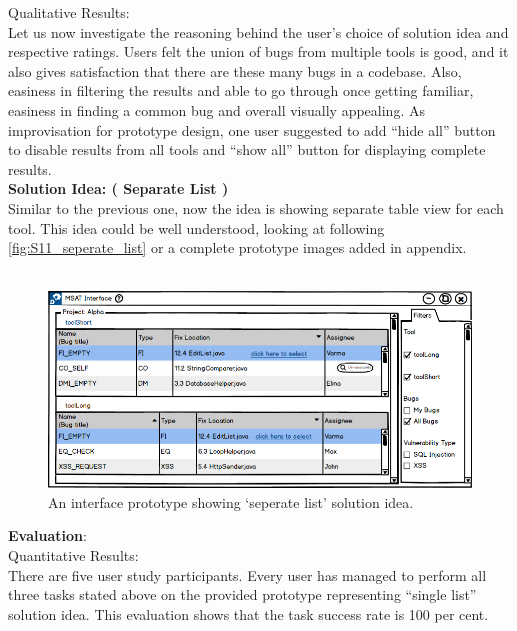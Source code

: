 Qualitative Results: \\

Let us now investigate the reasoning behind the user’s choice of solution idea and respective ratings. Users felt the union of bugs from multiple tools is good, and it also gives satisfaction that there are these many bugs in a codebase. Also, easiness in filtering the results and able to go through once getting familiar, easiness in finding a common bug and overall visually appealing. As improvisation for prototype design, one user suggested to add “hide all” button to disable results from all tools and “show all” button for displaying complete results. \\


\textbf{Solution Idea: ( Separate List )} \\

Similar to the previous one, now the idea is showing separate table view for each tool. This idea could be well understood, looking at following \autoref{fig:S11_seperate_list} or a complete prototype images added in appendix. \\ \\


\begin{figure}[hbt!]
	\centering
	\includegraphics[width=\linewidth]{figures/solution_ideas_snaps/S11_seperate_list}
	\caption{An interface prototype showing ‘seperate list’ solution idea.}
	\label{fig:S11_seperate_list}
\end{figure}


\textbf{Evaluation}: \\

Quantitative Results: \\

There are five user study participants. Every user has managed to perform all three tasks stated above on the provided prototype representing “single list” solution idea. This evaluation shows that the task success rate is 100 per cent. \\

